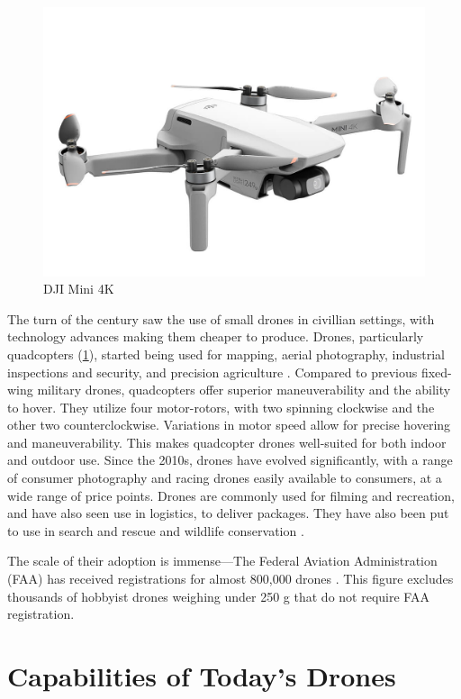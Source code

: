 \begin{figure}[htbp]
\centerline{\includegraphics[width = .4\textwidth]{figs/dji-mini-4k.jpg}}
\caption{DJI Mini 4K}
\label{fig:dji-mini-4k}
\end{figure}

The turn of the century saw the use of small drones in civillian settings, with
technology advances making them cheaper to produce. Drones, particularly
quadcopters (\cref{fig:dji-mini-4k}), started being used for mapping, aerial
photography, industrial inspections and security, and precision agriculture
\cite{giones2017}. Compared to previous fixed-wing military drones, quadcopters
offer superior maneuverability and the ability to hover. They utilize four
motor-rotors, with two spinning clockwise and the other two counterclockwise.
Variations in motor speed allow for precise hovering and maneuverability. This
makes quadcopter drones well-suited for both indoor and outdoor use.  Since the
2010s, drones have evolved significantly, with a range of consumer photography
and racing drones easily available to consumers, at a wide range of price
points. Drones are commonly used for filming and recreation, and have also seen
use in logistics, to deliver packages. They have also been put to use in search and rescue
\cite{scherer2015}\cite{tomic2012}\cite{mcrae2019} and wildlife conservation \cite{gemert2015}\cite{gonzalez2016}.

The scale of their adoption is
immense---The Federal Aviation Administration (FAA) has received registrations
for almost 800,000 drones \cite{faa_drones_2024}.  This figure excludes
thousands of hobbyist drones weighing under 250 g that do not require FAA
registration.

\section{Capabilities of Today's Drones}
\label{sec:drone-capabilities}

